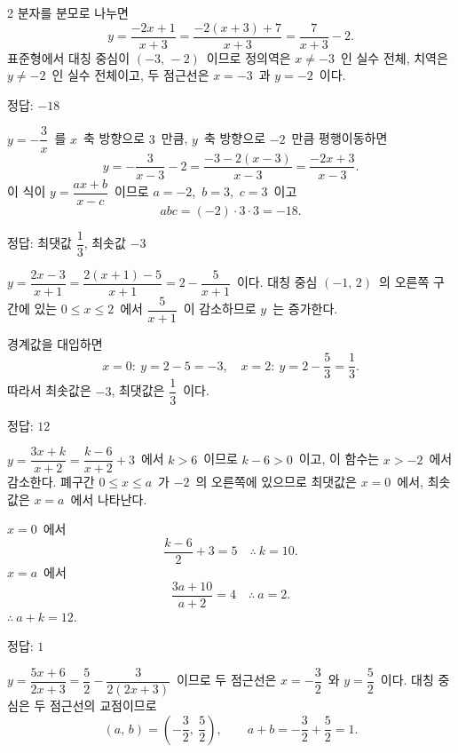 \documentclass[10pt,fleqn]{article}
\begin{document}
\begin{multicols*}{2}
분자를 분모로 나누면
\[ y=\dfrac{-2x+1}{x+3}=\dfrac{-2(x+3)+7}{x+3}=\dfrac{7}{x+3}-2. \]
표준형에서 대칭 중심이 $(-3,\, -2)$\ 이므로 정의역은 $x\ne -3$\ 인 실수 전체, 치역은 $y\ne -2$\ 인 실수 전체이고, 두 점근선은 $x=-3$\ 과 $y=-2$\ 이다.

\begin{dmanswerbox}
정답: $-18$
\end{dmanswerbox}

$y=-\dfrac{3}{x}$\ 를 $x$\ 축 방향으로 $3$\ 만큼, $y$\ 축 방향으로 $-2$\ 만큼 평행이동하면
\[ y=-\dfrac{3}{x-3}-2=\dfrac{-3-2(x-3)}{x-3}=\dfrac{-2x+3}{x-3}. \]
이 식이 $y=\dfrac{ax+b}{x-c}$\ 이므로 $a=-2$,\ $b=3$,\ $c=3$\ 이고
\[ abc=(-2)\cdot 3\cdot 3=-18. \]

\begin{dmanswerbox}
정답: 최댓값 $\dfrac{1}{3}$, 최솟값 $-3$
\end{dmanswerbox}

$y=\dfrac{2x-3}{x+1}=\dfrac{2(x+1)-5}{x+1}=2-\dfrac{5}{x+1}$\ 이다. 대칭 중심 $(-1,\, 2)$\ 의 오른쪽 구간에 있는 $0\le x\le 2$\ 에서 $\dfrac{5}{x+1}$\ 이 감소하므로 $y$\ 는 증가한다.

경계값을 대입하면
\[ x=0:\ y=2-5=-3,\quad x=2:\ y=2-\dfrac{5}{3}=\dfrac{1}{3}. \]
따라서 최솟값은 $-3$, 최댓값은 $\dfrac{1}{3}$\ 이다.

\begin{dmanswerbox}
정답: $12$
\end{dmanswerbox}

$y=\dfrac{3x+k}{x+2}=\dfrac{k-6}{x+2}+3$\ 에서 $k>6$\ 이므로 $k-6>0$\ 이고, 이 함수는 $x>-2$\ 에서 감소한다. 폐구간 $0\le x\le a$\ 가 $-2$\ 의 오른쪽에 있으므로 최댓값은 $x=0$\ 에서, 최솟값은 $x=a$\ 에서 나타난다.

$x=0$\ 에서
\[ \dfrac{k-6}{2}+3=5\quad\therefore\ k=10. \]
$x=a$\ 에서
\[ \dfrac{3a+10}{a+2}=4\quad\therefore\ a=2. \]
$\therefore\ a+k=12$.
\begin{dmanswerbox}
정답: $1$
\end{dmanswerbox}

$y=\dfrac{5x+6}{2x+3}=\dfrac{5}{2}-\dfrac{3}{2(2x+3)}$\ 이므로 두 점근선은 $x=-\dfrac{3}{2}$\ 와 $y=\dfrac{5}{2}$\ 이다. 대칭 중심은 두 점근선의 교점이므로
\[ (a,\, b)=\left(-\dfrac{3}{2},\ \dfrac{5}{2}\right),\qquad a+b=-\dfrac{3}{2}+\dfrac{5}{2}=1. \]


\end{multicols*}
\end{document}
